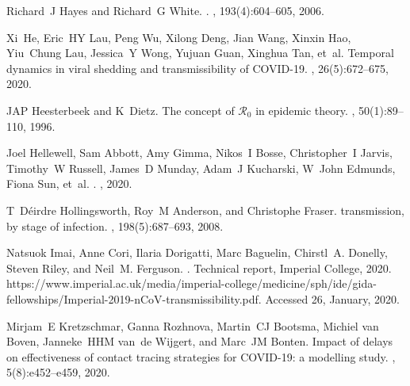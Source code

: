 \documentclass[12pt]{article}
\begin{document}
\begin{thebibliography}{10}
Richard~J Hayes and Richard~G White.
.
, 193(4):604--605, 2006.

Xi~He, Eric~HY Lau, Peng Wu, Xilong Deng, Jian Wang, Xinxin Hao, Yiu~Chung Lau,
  Jessica~Y Wong, Yujuan Guan, Xinghua Tan, et~al.
\newblock Temporal dynamics in viral shedding and transmissibility of
  {COVID-19}.
, 26(5):672--675, 2020.

JAP Heesterbeek and K~Dietz.
\newblock The concept of {$\mathcal{R}_0$} in epidemic theory.
, 50(1):89--110, 1996.

Joel Hellewell, Sam Abbott, Amy Gimma, Nikos~I Bosse, Christopher~I Jarvis,
  Timothy~W Russell, James~D Munday, Adam~J Kucharski, W~John Edmunds, Fiona
  Sun, et~al.
.
, 2020.

T~D{\'e}irdre Hollingsworth, Roy~M Anderson, and Christophe Fraser.
 transmission, by stage of infection.
, 198(5):687--693, 2008.

Natsuok Imai, Anne Cori, Ilaria Dorigatti, Marc Baguelin, Chirstl~A. Donelly,
  Steven Riley, and Neil~M. Ferguson.
.
\newblock Technical report, Imperial College, 2020.
\newblock
  https://www.imperial.ac.uk/media/imperial-college/medicine/sph/ide/gida-fellowships/Imperial-2019-nCoV-transmissibility.pdf.
  Accessed 26, January, 2020.

Mirjam~E Kretzschmar, Ganna Rozhnova, Martin~CJ Bootsma, Michiel van Boven,
  Janneke~HHM van~de Wijgert, and Marc~JM Bonten.
\newblock Impact of delays on effectiveness of contact tracing strategies for
  {COVID-19}: a modelling study.
, 5(8):e452--e459, 2020.


\end{thebibliography}
\end{document}
